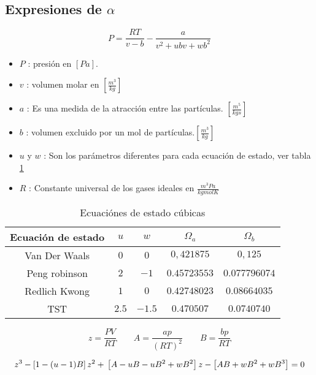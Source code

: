 \subsection{Expresiones de $\alpha$}

	
	
	
		
	
	
	
	
	
	
	
	
	
	




\begin{equation}
P = \frac{R T}{v-b} - \frac{a}{v^2 +u b v + w b^2 }
\end{equation}


\begin{itemize}\itemsep0ex
\item $P$ : presión en $[Pa]$.
\item $v$ : volumen molar en $[\frac{m^3}{kg}]$
\item $a$ : Es una medida de la atracción entre las partículas. $[\frac{m^5}{kg s}]$
\item $b$ : volumen excluido por un mol de partículas.$[\frac{m^3}{kg}]$
\item $u$ y $w$ : Son los parámetros diferentes para cada ecuación de estado, ver tabla \ref{tab:cubics}
\item $R$ : Constante universal de los gases ideales en $\frac{m^3 Pa}{kgmol K}$
\end{itemize}

	\begin{table}
	
	\begin{tabular}{|c |c | c | c | c |}
		\hline
		Ecuación de estado  & $u$ & $w$ & $\Omega_a$&$\Omega_b$\\
		\hline
		Van Der Waals  & $0$ & $0$ & $0,421875$ & $0,125$\\
		\hline
		Peng robinson  & $2$ & $-1$ & $0.45723553$ & $0.077796074$\\
		\hline
		Redlich Kwong  & $1$ & $0$ & $0.42748023$ & $0.08664035$\\
		\hline
		TST  & $2.5$ & $-1.5$ &$ 0.470507$ & $0.0740740$\\
		\hline
	\end{tabular}
	\caption{Ecuaciónes de estado cúbicas}\label{tab:cubics}
	\end{table}





\begin{equation}
z= \frac{P V}{R T}
\qquad
A=\frac{ap}{(RT)^2}
\qquad
B=\frac{bp}{RT}
\end{equation}

\begin{equation}
z^3-\left[1-(u-1)B\right]z^2+ \\ \left[A-uB-uB^2 +\\ wB^2\right]z-\left[AB+wB^2+wB^3\right]=0
\end{equation}